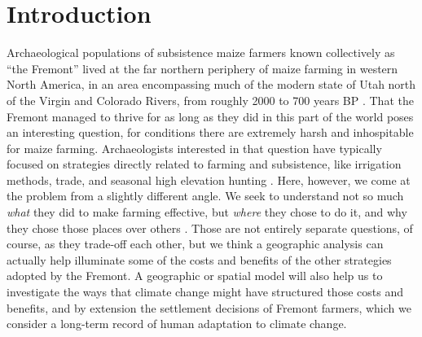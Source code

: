 \documentclass[
  number,
  preprint,
  3p]{elsarticle}
\begin{document}
    \ifdefined\Shaded\renewenvironment{Shaded}{\begin{tcolorbox}[breakable, boxrule=0pt, borderline west={3pt}{0pt}{shadecolor}, enhanced, sharp corners, frame hidden, interior hidden]}{\end{tcolorbox}}\fi

\hypertarget{introduction}{%
\section{Introduction}\label{introduction}}

Archaeological populations of subsistence maize farmers known
collectively as ``the Fremont'' lived at the far northern periphery of
maize farming in western North America, in an area encompassing much of
the modern state of Utah north of the Virgin and Colorado Rivers, from
roughly 2000 to 700 years BP \citep{madsen1989, madsen1998}. That the
Fremont managed to thrive for as long as they did in this part of the
world poses an interesting question, for conditions there are extremely
harsh and inhospitable for maize farming. Archaeologists interested in
that question have typically focused on strategies directly related to
farming and subsistence, like irrigation methods, trade, and seasonal
high elevation hunting
\citep[e.g.,][]{barlow2008, boomgarden2019, janetski2002, hart2021, madsen1998, metcalfe1985, patterson2010, spangler1993, morgan2012}.
Here, however, we come at the problem from a slightly different angle.
We seek to understand not so much \emph{what} they did to make farming
effective, but \emph{where} they chose to do it, and why they chose
those places over others \citep[e.g.,][]{bocinsky2014, thomson2020}.
Those are not entirely separate questions, of course, as they trade-off
each other, but we think a geographic analysis can actually help
illuminate some of the costs and benefits of the other strategies
adopted by the Fremont. A geographic or spatial model will also help us
to investigate the ways that climate change might have structured those
costs and benefits, and by extension the settlement decisions of Fremont
farmers, which we consider a long-term record of human adaptation to
climate change.
\end{document}
